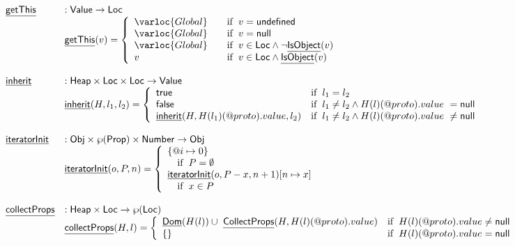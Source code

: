\[
\begin{array}{ll}
\chf{getThis} & : \SF{Value} \rightarrow \SF{Loc} \\
& \chf{getThis}(v)
  = 
  \left\{
    \begin{array}{l@{\quad\quad}l}
      \varloc{Global} & \ifc{v=\SF{undefined}} \\
      \varloc{Global} & \ifc{v=\SF{null}} \\
      \varloc{Global} & \ifc{v\in\SF{Loc} \land \lnot\chf{IsObject}(v)} \\
      v               & \ifc{v\in\SF{Loc} \land \chf{IsObject}(v)}\\
    \end{array}
  \right.\\
\\
\chf{inherit} & : \SF{Heap} \times \SF{Loc} \times \SF{Loc} \rightarrow \SF{Value} \\
& \chf{inherit}(H,l_1,l_2) = \left\{
  \begin{array}{ll}
    \vtrue & \ifc{l_1 = l_2} \\
    \vfalse & \ifc{l_1 \neq l_2 \land H(l)(\varprop{proto}).value\ = \SF{null}} \\
    \chf{inherit}(H,H(l_1)(\varprop{proto}).value,l_2) & \ifc{l_1 \neq l_2 \land H(l)(\varprop{proto}).value\ \neq \SF{null}} \\
  \end{array}
  \right.\\
\\
\chf{iteratorInit} & : \SF{Obj} \times \powerset{\SF{Prop}} \times \SF{Number} \rightarrow \SF{Obj} \\
& \chf{iteratorInit}(o,P,n) = 
  \left\{
  \begin{array}{l}
    \{\varprop{i}\mapsto 0\} \\\quad\ifc{P = \emptyset} \\
    \chf{iteratorInit}(o,P-x,n+1)[n\mapsto x] \\\quad \ifc{x\in P} \\
  \end{array}
  \right.\\
\\
\chf{collectProps} & : \SF{Heap} \times \SF{Loc} \rightarrow \powerset{\SF{Loc}} \\
& \chf{collectProps}(H,l) = 
  \left\{
  \begin{array}{ll}
    \chf{Dom}(H(l)) \cup\ \chf{CollectProps}(H,H(l)(\varprop{proto}).value)
    & \ifc{H(l)(\varprop{proto}).value \neq \SF{null}} \\
    \{\} & \ifc{H(l)(\varprop{proto}).value = \SF{null}} \\
  \end{array}
  \right.\\
\\
\end{array}
\]

